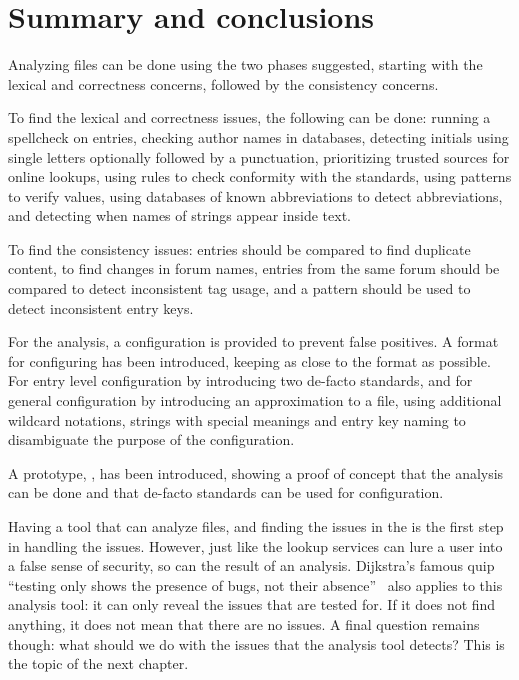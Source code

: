 \section{Summary and conclusions}

Analyzing {\bibtex} files can be done using the two phases suggested,
starting with the lexical and correctness concerns, followed by the
consistency concerns.

To find the lexical and correctness issues, the following can be done:
running a spellcheck on entries, checking author names in databases,
detecting initials using single letters optionally followed by a
punctuation, prioritizing trusted sources for online lookups, using
rules to check conformity with the standards, using patterns to verify
values, using databases of known abbreviations to detect
abbreviations, and detecting when names of strings appear inside text.

To find the consistency issues: entries should be compared to find
duplicate content, to find changes in forum names, entries from the
same forum should be compared to detect inconsistent tag usage, and a
pattern should be used to detect inconsistent entry keys.

For the analysis, a configuration is provided to prevent false
positives.  A format for configuring has been introduced, keeping as
close to the {\bibtex} format as possible.  For entry level
configuration by introducing two de-facto standards, and for general
configuration by introducing an approximation to a {\bibtex} file,
using additional wildcard notations, strings with special meanings and
entry key naming to disambiguate the purpose of the configuration.

A prototype, {\orangutan}, has been introduced, showing a proof of
concept that the analysis can be done and that de-facto standards can
be used for configuration.

Having a tool that can analyze {\bibtex} files, and finding the issues
in the  is the first step in handling the issues.  However,
just like the lookup services can lure a user into a false sense of
security, so can the result of an analysis.  Dijkstra's famous quip
``testing only shows the presence of bugs, not their
absence''~\cite{buxton1970_software} also applies to this analysis
tool: it can only reveal the issues that are tested for.  If it does
not find anything, it does not mean that there are no issues.  A final
question remains though: what should we do with the issues that the
analysis tool detects?  This is the topic of the next chapter.

